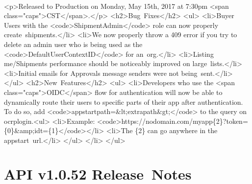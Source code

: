 \documentclass{memoir}%
\begin{document}
\paragraph*{}%
<p>Released to Production on Monday, May 15th, 2017 at 7:30pm <span class="caps">CST</span>.</p>\newline%
<h2>Bug~Fixes</h2>\newline%
<ul>\newline%
<li>Buyer Users with the <code>ShipmentAdmin</code> role can now properly create~shipments.</li>\newline%
<li>We now properly throw a 409 error if you try to delete an admin user who is being used as the <code>DefaultUserContextID</code> for an~org.</li>\newline%
<li>Listing me/Shipments performance should be noticeably improved on large~lists.</li>\newline%
<li>Initial emails for Approvals message senders were not being~sent.</li>\newline%
</ul>\newline%
<h2>New~Features</h2>\newline%
<ul>\newline%
<li>Developers who use the <span class="caps">OIDC</span> flow for authentication will now be able to dynamically route their users to specific parts of their app after authentication. To do so, add <code>appstartpath=\&lt;extrapath\&gt;</code> to the query on ocrplogin.<ul>\newline%
<li>Example: <code>https://nodomain.com/myapp\{2\}?token=\{0\}\&amp;idt=\{1\}</code></li>\newline%
<li>The \{2\} can go anywhere in the appstart~url.</li>\newline%
</ul>\newline%
</li>\newline%
</ul>

%
\section*{API v1.0.52 Release~Notes}%
\paragraph*{}%

%
\end{document}

